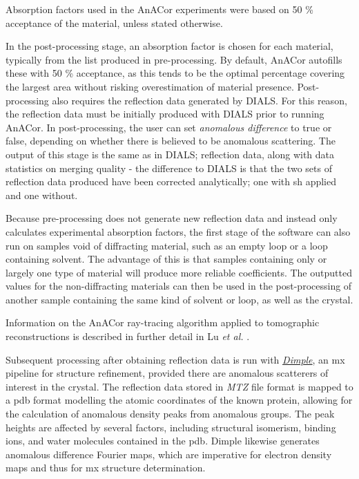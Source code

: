 Absorption factors used in the AnACor experiments were based on 50 \% acceptance of the material, unless stated otherwise.

In the post-processing stage, an absorption factor is chosen for each material, typically from the list produced in pre-processing. By default, AnACor autofills these with 50 \% acceptance, as this tends to be the optimal percentage covering the largest area without risking overestimation of material presence. Post-processing also requires the reflection data generated by DIALS. For this reason, the reflection data must be initially produced with DIALS prior to running AnACor. In post-processing, the user can set \textit{anomalous difference} to true or false, depending on whether there is believed to be anomalous scattering. The output of this stage is the same as in DIALS; reflection data, along with data statistics on merging quality - the difference to DIALS is that the two sets of reflection data produced have been corrected analytically; one with \ac{sh} applied and one without.

Because pre-processing does not generate new reflection data and instead only calculates experimental absorption factors, the first stage of the software can also run on samples void of diffracting material, such as an empty loop or a loop containing solvent. The advantage of this is that samples containing only or largely one type of material will produce more reliable coefficients. The outputted values for the non-diffracting materials can then be used in the post-processing of another sample containing the same kind of solvent or loop, as well as the crystal.

Information on the AnACor ray-tracing algorithm applied to tomographic reconstructions is described in further detail in Lu \textit{et al.} \cite{Lu2024}.

Subsequent processing after obtaining reflection data is run with \href{http://ccp4.github.io/dimple}{\textit{Dimple}}, an \ac{mx} pipeline for structure refinement, provided there are anomalous scatterers of interest in the crystal. The reflection data stored in \textit{MTZ} file format is mapped to a \ac{pdb} format modelling the atomic coordinates of the known protein, allowing for the calculation of anomalous density peaks from anomalous groups. The peak heights are affected by several factors, including structural isomerism, binding ions, and water molecules contained in the \ac{pdb}. %
Dimple likewise generates anomalous difference Fourier maps, which are imperative for electron density maps and thus for \ac{mx} structure determination. %

